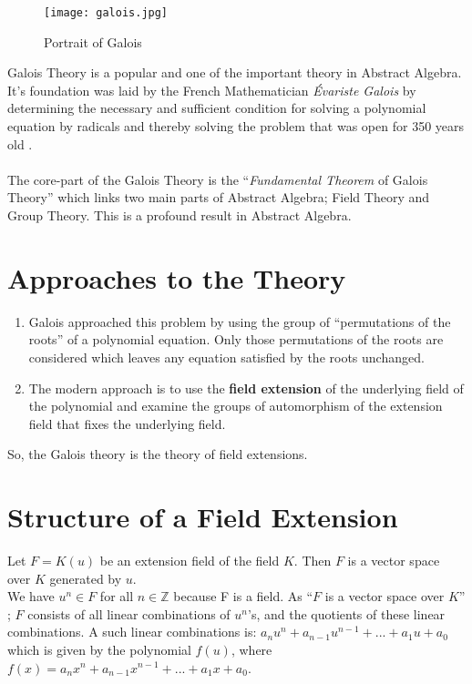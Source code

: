 \begin{wrapfigure}{r}{0.3\textwidth}
  \texttt{[image: galois.jpg]}
  \caption{\footnotesize Portrait of Galois}
\end{wrapfigure}

Galois Theory is a popular and one of the important theory in Abstract Algebra. It's foundation was laid by the French Mathematician \textit{Évariste Galois} by determining the necessary and sufficient condition for solving a polynomial equation by radicals and thereby solving the problem that was open for 350 years old \cite{galois}.\\ \\
The core-part of the Galois Theory is the ``\textit{Fundamental Theorem} of Galois Theory'' \cite {hunger}  which links two main parts of Abstract Algebra; Field Theory and Group Theory. This is a profound result in Abstract Algebra.

\vspace{15mm}
\section{Approaches to the Theory}
\begin{enumerate}
\item Galois approached this problem by using the group of ``permutations of the roots'' \cite{galois}  of a polynomial equation. Only those permutations of the roots are considered which leaves any equation satisfied by the roots unchanged.

\item The modern approach is to use the \textbf{field extension} of the underlying field of the polynomial and examine the groups of automorphism of the extension field that fixes the underlying field.
\end{enumerate}
So, the Galois theory is the theory of field extensions.
\clearpage

\section{Structure of a Field Extension}
Let \(F=K(u)\) be an extension field of the field \(K\). Then \(F\) is a vector space over \(K\) generated by \(u\).\\
We have \(u^n \in F\) for all \(n \in \mathbb{Z}\) because F is a field. As ``\(F\) is a vector space over \(K\)'' \cite{hunger}; \(F\) consists of all linear combinations of \(u^n \)'s, and the quotients of these linear combinations. A such linear combinations is: \(a_nu^n+a_{n-1}u^{n-1}+...+a_1u+a_0\) which is  given by the polynomial \(f(u)\), where \(f(x)=a_nx^n+a_{n-1}x^{n-1}+...+a_1x+a_0\).\\

